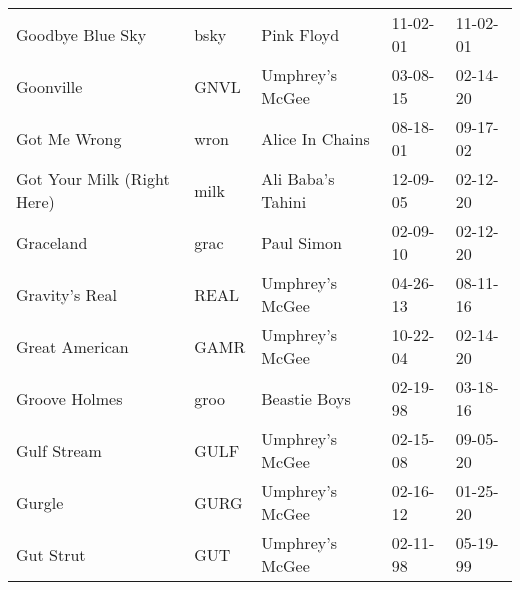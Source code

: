 \begin{longtable}{p{}p{}p{}p{}p{}}
                                                        Goodbye Blue Sky &          bsky &                                               Pink Floyd &              11-02-01 &             11-02-01 \\
                                                               Goonville &          GNVL &                                          Umphrey's McGee &              03-08-15 &             02-14-20 \\
                                                            Got Me Wrong &          wron &                                          Alice In Chains &              08-18-01 &             09-17-02 \\
                                              Got Your Milk (Right Here) &          milk &                                        Ali Baba's Tahini &              12-09-05 &             02-12-20 \\
                                                               Graceland &          grac &                                               Paul Simon &              02-09-10 &             02-12-20 \\
                                                          Gravity's Real &          REAL &                                          Umphrey's McGee &              04-26-13 &             08-11-16 \\
                                                          Great American &          GAMR &                                          Umphrey's McGee &              10-22-04 &             02-14-20 \\
                                                           Groove Holmes &          groo &                                             Beastie Boys &              02-19-98 &             03-18-16 \\
                                                             Gulf Stream &          GULF &                                          Umphrey's McGee &              02-15-08 &             09-05-20 \\
                                                                  Gurgle &          GURG &                                          Umphrey's McGee &              02-16-12 &             01-25-20 \\
                                                               Gut Strut &           GUT &                                          Umphrey's McGee &              02-11-98 &             05-19-99 \\

\end{longtable}
